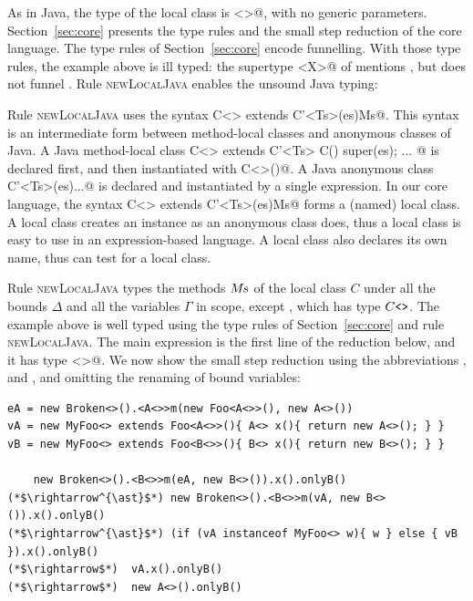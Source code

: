 As in Java, the type of the local class is \Q@MyFoo<>@, with no generic parameters.
Section~\ref{sec:core} presents the type rules and the small step reduction of the core language.
The type rules of Section~\ref{sec:core} encode funnelling.
With those type rules, the example above is ill typed: the supertype \Q@Foo<X>@ of \Q@MyFoo@ mentions \Q@X@, but \Q@MyFoo@ does not funnel \Q@X@.
Rule \textsc{newLocalJava} enables the unsound Java typing:
\begin{linenomath*}
\begin{mathpar}
\end{mathpar}
\end{linenomath*}
Rule \textsc{newLocalJava} uses the syntax \Q@new C<> extends C'<Ts>(es){Ms}@.
This syntax is an intermediate form between method-local classes and anonymous classes of Java.
A Java method-local class \Q@class C<> extends C'<Ts>{ C(){ super(es); } ... }@ is declared first, and then instantiated with \Q@new C<>()@.
A Java anonymous class \Q@new C'<Ts>(es){...}@ is declared and instantiated by a single expression.
In our core language, the syntax \Q@new C<> extends C'<Ts>(es){Ms}@ forms a (named) local class.
A local class creates an instance as an anonymous class does, thus a local class is easy to use in an expression-based language.
A local class also declares its own name, thus \Q@instanceof@ can test for a local class.

Rule \textsc{newLocalJava} types the methods $M\mkern-2mu s$ of the local class $C$ under all the bounds $\Delta$ and all the variables $\Gamma$ in scope, except \Q@this@, which has type $C\text{\ttfamily <}\text{\ttfamily >}$.
The example above is well typed using the type rules of Section~\ref{sec:core} and rule \textsc{newLocalJava}.
The main expression is the first line of the reduction below, and it has type \Q@B<>@.
We now show the small step reduction using the abbreviations \Q@eA@, \Q@vA@ and \Q@vB@, and omitting the renaming of bound variables:

\begin{lstlisting}
eA = new Broken<>().<A<>>m(new Foo<A<>>(), new A<>())
vA = new MyFoo<> extends Foo<A<>>(){ A<> x(){ return new A<>(); } }
vB = new MyFoo<> extends Foo<B<>>(){ B<> x(){ return new B<>(); } }

    new Broken<>().<B<>>m(eA, new B<>()).x().onlyB()
(*$\rightarrow^{\ast}$*) new Broken<>().<B<>>m(vA, new B<>()).x().onlyB()
(*$\rightarrow^{\ast}$*) (if (vA instanceof MyFoo<> w){ w } else { vB }).x().onlyB()
(*$\rightarrow$*)  vA.x().onlyB()
(*$\rightarrow$*)  new A<>().onlyB()
\end{lstlisting}

